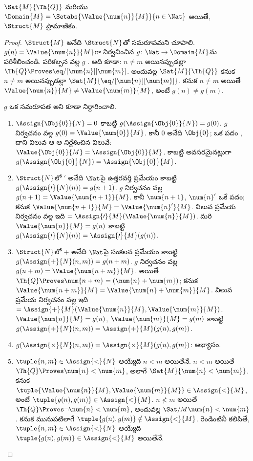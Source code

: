 \documentclass[../../../include/open-logic-section]{subfiles}
\begin{document}
\begin{prop}
$\Sat{M}{\Th{Q}}$ మరియు
$\Domain{M}=\Setabs{\Value{\num{n}}{M}}{n\in\Nat}$ అయితే,
$\Struct{M}$ ప్రామాణికం.
\end{prop}

\begin{proof}
$\Struct{M}$ అనేది $\Struct{N}$తో సమరూపమని చూపాలి.
$g(n)=\Value{\num{n}}{M}$గా నిర్వచించిన
$g\colon\Nat\to\Domain{M}$ను పరిశీలించండి. పరికల్పన వల్ల $g$
. అది
 కూడా: $n\neq m$ అయినప్పుడల్లా
$\Th{Q}\Proves\eq/[\num{n}][\num{m}]$. అందువల్ల
$\Sat{M}{\Th{Q}}$ కనుక $n\neq m$ అయినప్పుడల్లా
$\Sat{M}{\eq/[\num{n}][\num{m}]}$. కనుక $n\neq m$ అయితే
$\Value{\num{n}}{M}\neq\Value{\num{m}}{M}$, అంటే $g(n)\neq g(m)$.

$g$ ఒక సమరూపత అని కూడా నిర్ధారించాలి.
\begin{enumerate}
\item $\Assign{\Obj{0}}{N}=0$ కాబట్టి
  $g(\Assign{\Obj{0}}{N})=g(0)$. $g$ నిర్వచనం వల్ల
  $g(0)=\Value{\num{0}}{M}$. కానీ $\num{0}$ అనేది $\Obj{0}$;
  ఒక పదం , దాని విలువ ఆ
   ఆ 
  నిర్దేశించిన విలువే:
  $\Value{\Obj{0}}{M}=\Assign{\Obj{0}}{M}$. కాబట్టి అవసరమైనట్లుగా
  $g(\Assign{\Obj{0}}{N})=\Assign{\Obj{0}}{M}$.
\item $\Struct{N}$లో $\prime$ అనేది $\Nat$పై ఉత్తరవర్తి ప్రమేయం
  కాబట్టి $g(\Assign{\prime}{N}(n))=g(n+1)$. $g$ నిర్వచనం వల్ల
  $g(n+1)=\Value{\num{n+1}}{M}$. కానీ $\num{n+1}$, $\num{n}'$ ఒకే
  పదం; కనుక $\Value{\num{n+1}}{M}=\Value{\num{n}'}{M}$. విలువ
  ప్రమేయ నిర్వచనం వల్ల ఇది
  $=\Assign{\prime}{M}(\Value{\num{n}}{M})$. మరి
  $\Value{\num{n}}{M}=g(n)$ కాబట్టి
  $g(\Assign{\prime}{N}(n))=\Assign{\prime}{M}(g(n))$.
\item $\Struct{N}$లో $+$ అనేది $\Nat$పై సంకలన ప్రమేయం కాబట్టి
  $g(\Assign{+}{N}(n,m))=g(n+m)$. $g$ నిర్వచనం వల్ల
  $g(n+m)=\Value{\num{n+m}}{M}$. అయితే
  $\Th{Q}\Proves\num{n+m}=(\num{n}+\num{m})$; కనుక
  $\Value{\num{n+m}}{M}=\Value{\num{n}+\num{m}}{M}$.
  విలువ ప్రమేయ నిర్వచనం వల్ల ఇది
  $=\Assign{+}{M}(\Value{\num{n}}{M},\Value{\num{m}}{M})$.
  $\Value{\num{n}}{M}=g(n)$, $\Value{\num{m}}{M}=g(m)$ కాబట్టి
  $g(\Assign{+}{N}(n,m))=\Assign{+}{M}(g(n),g(m))$.
\item $g(\Assign{\times}{N}(n,m))
  =\Assign{\times}{M}(g(n),g(m))$: అభ్యాసం.
\item $\tuple{n,m}\in\Assign{<}{N}$ అయ్యేది $n<m$ అయితేనే.
  $n<m$ అయితే $\Th{Q}\Proves\num{n}<\num{m}$, అలాగే
  $\Sat{M}{\num{n}<\num{m}}$. కనుక
  $\tuple{\Value{\num{n}}{M},\Value{\num{m}}{M}}\in\Assign{<}{M}$,
  అంటే $\tuple{g(n),g(m)}\in\Assign{<}{M}$. $n\not<m$ అయితే
  $\Th{Q}\Proves\lnot\num{n}<\num{m}$, అందువల్ల
  $\Sat/{M}{\num{n}<\num{m}}$. కనుక మునుపటిలాగే
  $\tuple{g(n),g(m)}\notin\Assign{<}{M}$. రెండింటినీ కలిపితే,
  $\tuple{n,m}\in\Assign{<}{N}$ అయ్యేది
  $\tuple{g(n),g(m)}\in\Assign{<}{M}$ అయితేనే.
\end{enumerate}
\end{proof}
\end{document}
